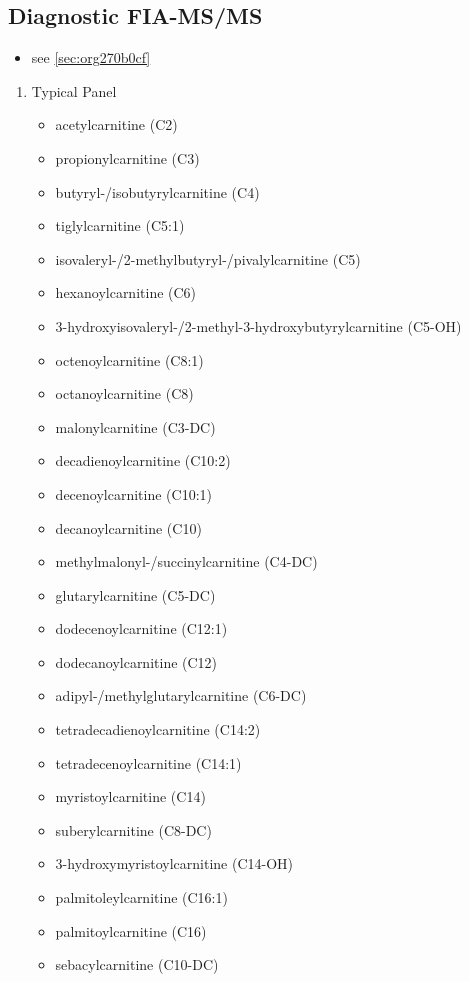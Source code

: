 \documentclass{scrartcl}
\begin{document}
\subsection{Diagnostic FIA-MS/MS}
\label{sec:orgbd2374b}
\begin{itemize}
\item see \ref{sec:org270b0cf}
\end{itemize}

\begin{enumerate}
\item Typical Panel
\label{sec:orgfb463f3}
\begin{itemize}
\item acetylcarnitine (C2)
\item propionylcarnitine (C3)
\item butyryl-/isobutyrylcarnitine (C4)
\item tiglylcarnitine (C5:1)
\item isovaleryl-/2-methylbutyryl-/pivalylcarnitine (C5)
\item hexanoylcarnitine (C6)
\item 3-hydroxyisovaleryl-/2-methyl-3-hydroxybutyrylcarnitine (C5-OH)
\item octenoylcarnitine (C8:1)
\item octanoylcarnitine (C8)
\item malonylcarnitine (C3-DC)
\item decadienoylcarnitine (C10:2)
\item decenoylcarnitine (C10:1)
\item decanoylcarnitine (C10)
\item methylmalonyl-/succinylcarnitine (C4-DC)
\item glutarylcarnitine (C5-DC)
\item dodecenoylcarnitine (C12:1)
\item dodecanoylcarnitine (C12)
\item adipyl-/methylglutarylcarnitine (C6-DC)
\item tetradecadienoylcarnitine (C14:2)
\item tetradecenoylcarnitine (C14:1)
\item myristoylcarnitine (C14)
\item suberylcarnitine (C8-DC)
\item 3-hydroxymyristoylcarnitine (C14-OH)
\item palmitoleylcarnitine (C16:1)
\item palmitoylcarnitine (C16)
\item sebacylcarnitine (C10-DC)

\end{itemize}
\end{enumerate}
\end{document}
